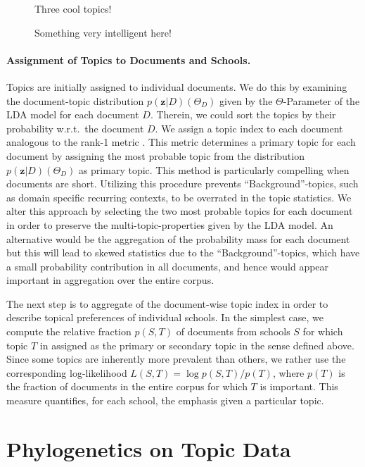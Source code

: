 \documentclass[a4paper,10pt]{article}
\newcommand{\TODO}[1]{\begingroup\color{red}#1\endgroup}
\begin{document}
\begin{figure}
  \begin{center} 
    \TODO{Three cool topics!} 
  \end{center}
  \caption{Something very intelligent here!}
  \label{fig:topixampl}
\end{figure}

\paragraph{Assignment of Topics to Documents and Schools.} 

Topics are initially assigned to individual documents. We do this by
examining the document-topic distribution $p(\mathbf{z}|D) (\Theta_D)$
given by the $\Theta$-Parameter of the LDA model for each document
$D$. Therein, we could sort the topics by their probability w.r.t.\ the
document $D$. We assign a topic index to each document analogous to the
rank-1 metric \cite{evans:2014}. This metric determines a primary topic for
each document by assigning the most probable topic from the distribution
$p(\mathbf{z}|D) (\Theta_D)$ as primary topic.  This method is particularly
compelling when documents are short. Utilizing this procedure prevents
``Background''-topics, such as domain specific recurring contexts, to be
overrated in the topic statistics. We alter this approach by selecting the
two most probable topics for each document in order to preserve the
multi-topic-properties given by the LDA model. An alternative would be the
aggregation of the probability mass for each document but this will lead to
skewed statistics due to the ``Background''-topics, which have a small
probability contribution in all documents, and hence would appear
  important in aggregation over the entire corpus.

The next step is to aggregate of the document-wise topic index in order to
describe topical preferences of individual schools.  In the simplest case,
we compute the relative fraction $p(S,T)$ of documents from schools $S$ for
which topic $T$ in assigned as the primary or secondary topic in the sense
defined above.  Since some topics are inherently more prevalent than
others, we rather use the corresponding log-likelihood $L(S,T) = \log
p(S,T)/p(T)$, where $p(T)$ is the fraction of documents in the entire
corpus for which $T$ is important. This measure quantifies, for each
school, the emphasis given a particular topic.

\section{Phylogenetics on Topic Data} 
\end{document}

